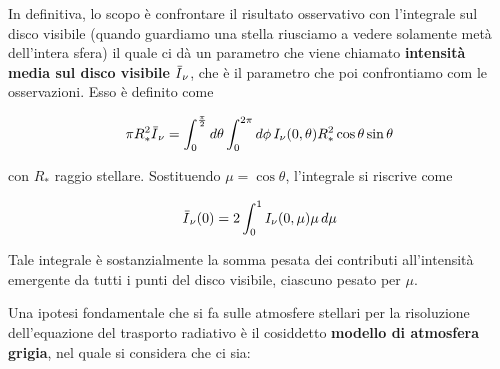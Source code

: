 \vspace{0.2cm}In definitiva, lo scopo è confrontare il risultato osservativo con l'integrale sul disco visibile (quando guardiamo una stella riusciamo a vedere solamente metà dell'intera sfera) il quale ci dà un parametro che viene chiamato \textbf{intensità media sul disco visibile} ${}\mkern3mu\overline{\mkern-3muI}_{\nu}$, che è il parametro che poi confrontiamo com le osservazioni. Esso è definito come

\begin{equation}
    \pi R^2_{*} {}\mkern3mu\overline{\mkern-3muI}_{\nu}
    =\int_{0}^{\frac{\pi}{2}} d\theta \int_{0}^{2 \pi} d\phi \, I_{\nu}(0,\theta) R^2_{*} \cos \theta \sin \theta
\end{equation}

con $R_{*}$ raggio stellare. Sostituendo $\mu=\cos\theta$, l'integrale si riscrive come

\begin{equation}
    {}\mkern3mu\overline{\mkern-3muI}_{\nu}(0)=2 \int_{0}^{1} I_{\nu}(0,\mu) \mu \, d \mu
\end{equation}

Tale integrale è sostanzialmente la somma pesata dei contributi all'intensità emergente da tutti i punti del disco visibile, ciascuno pesato per $\mu$.

Una ipotesi fondamentale che si fa sulle atmosfere stellari per la risoluzione dell'equazione del trasporto radiativo è il cosiddetto \textbf{modello di atmosfera grigia}, nel quale si considera che ci sia:

